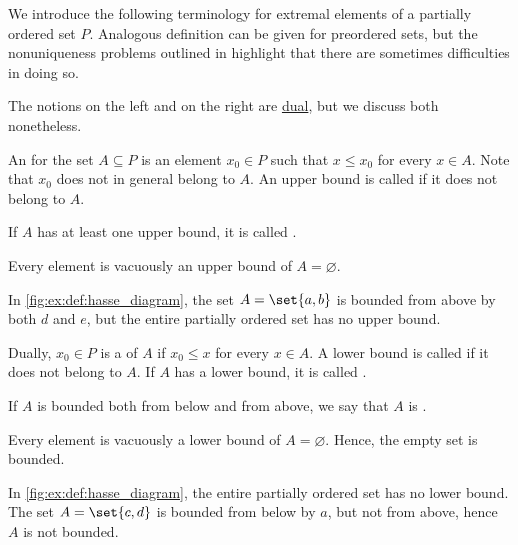 \begin{definition}\label{def:extremal_points}
  We introduce the following terminology for extremal elements of a partially ordered set \( P \). Analogous definition can be given for preordered sets, but the nonuniqueness problems outlined in  highlight that there are sometimes difficulties in doing so.

  The notions on the left and on the right are \hyperref[thm:preorder_duality]{dual}, but we discuss both nonetheless.

  \begin{thmenum}
    \begin{minipage}[t]{0.45\textwidth}
      An  for the set \( A \subseteq P \) is an element \( x_0 \in P \) such that \( x \leq x_0 \) for every \( x \in A \). Note that \( x_0 \) does not in general belong to \( A \). An upper bound is called  if it does not belong to \( A \).

      If \( A \) has at least one upper bound, it is called .

      Every element is vacuously an upper bound of \( A = \varnothing \).

      In \cref{fig:ex:def:hasse_diagram}, the set \( A = \set{ a, b } \) is bounded from above by both \( d \) and \( e \), but the entire partially ordered set has no upper bound.
    \end{minipage}
    \hspace{0.02\textwidth}
    \begin{minipage}[t]{0.45\textwidth}
      Dually, \( x_0 \in P \) is a  of \( A \) if \( x_0 \leq x \) for every \( x \in A \). A lower bound is called  if it does not belong to \( A \). If \( A \) has a lower bound, it is called .

      If \( A \) is bounded both from below and from above, we say that \( A \) is .

      Every element is vacuously a lower bound of \( A = \varnothing \). Hence, the empty set is bounded.

      In \cref{fig:ex:def:hasse_diagram}, the entire partially ordered set has no lower bound. The set \( A = \set{ c, d } \) is bounded from below by \( a \), but not from above, hence \( A \) is not bounded.
    \end{minipage}


\end{thmenum}
\end{definition}
